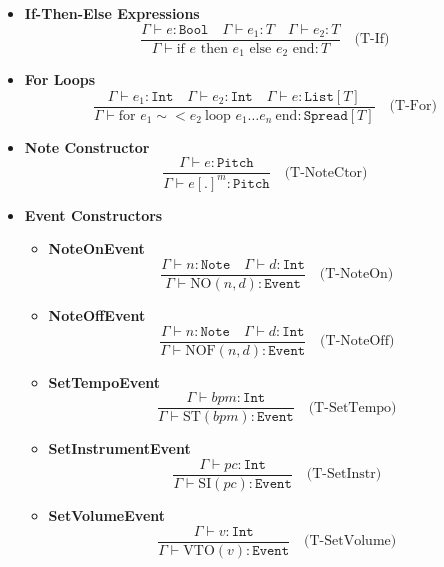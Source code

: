 \documentclass[letterpaper,12pt]{article}
\begin{document}
\begin{itemize}
    \item \textbf{If-Then-Else Expressions}
    \[
    \frac{
        \Gamma \vdash e : \texttt{Bool} \quad \Gamma \vdash e_1 : T \quad \Gamma \vdash e_2 : T
    }{
        \Gamma \vdash \text{if } e \text{ then } e_1 \text{ else } e_2 \text{ end} : T
    } \quad \text{(T-If)}
    \]
    
    \item \textbf{For Loops}
    \[
    \frac{
        \Gamma \vdash e_1 : \texttt{Int} \quad \Gamma \vdash e_2 : \texttt{Int} \quad \Gamma \vdash e : \texttt{List}[T] 
    }{
        \Gamma \vdash \text{for } e_1 \sim< e_2 \ \text{loop } e_1\dots e_n \ \text{end} : \texttt{Spread}[T]
    } \quad \text{(T-For)}
    \]
    
    \item \textbf{Note Constructor}
    \[
    \frac{
        \Gamma \vdash e : \texttt{Pitch}
    }{
        \Gamma \vdash e [.]^m : \texttt{Pitch}
    } \quad \text{(T-NoteCtor)}
    \]
    
    \item \textbf{Event Constructors}
    \begin{itemize}
        \item \textbf{NoteOnEvent}
        \[
        \frac{
            \Gamma \vdash n : \texttt{Note} \quad \Gamma \vdash d : \texttt{Int}
        }{
            \Gamma \vdash \text{NO}(n, d) : \texttt{Event}
        } \quad \text{(T-NoteOn)}
        \]
    
        \item \textbf{NoteOffEvent}
        \[
        \frac{
            \Gamma \vdash n : \texttt{Note} \quad \Gamma \vdash d : \texttt{Int}
        }{
            \Gamma \vdash \text{NOF}(n, d) : \texttt{Event}
        } \quad \text{(T-NoteOff)}
        \]
    
        \item \textbf{SetTempoEvent}
        \[
        \frac{
            \Gamma \vdash bpm : \texttt{Int}
        }{
            \Gamma \vdash \text{ST}(bpm) : \texttt{Event}
        } \quad \text{(T-SetTempo)}
        \]
    
        \item \textbf{SetInstrumentEvent}
        \[
        \frac{
            \Gamma \vdash pc : \texttt{Int}
        }{
            \Gamma \vdash \text{SI}(pc) : \texttt{Event}
        } \quad \text{(T-SetInstr)}
        \]
    
        \item \textbf{SetVolumeEvent}
        \[
        \frac{
            \Gamma \vdash v : \texttt{Int}
        }{
            \Gamma \vdash \text{VTO}(v) : \texttt{Event}
        } \quad \text{(T-SetVolume)}
        \]
    \end{itemize}
    

\end{itemize}
\end{document}
